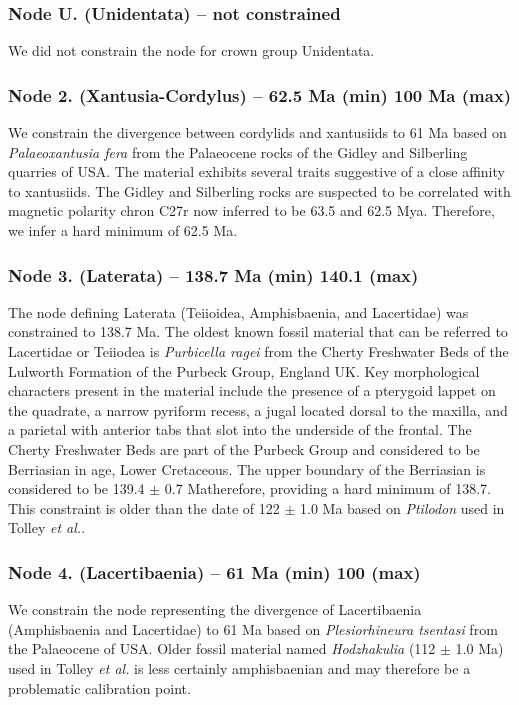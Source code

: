 \documentclass[a4paper, 12pt]{article}
\begin{document}
\subsubsection*{Node U. (Unidentata) – not constrained}
We did not constrain the node for crown group Unidentata.
 
\subsubsection*{Node 2. (Xantusia-Cordylus) – 62.5 Ma (min) 100 Ma (max)}
We constrain the divergence between cordylids and xantusiids to 61 Ma based on \textit{Palaeoxantusia fera} from the Palaeocene rocks of the Gidley and Silberling quarries of USA\cite{smith2009eocene}. The material exhibits several traits suggestive of a close affinity to xantusiids\cite{smith2009eocene,smith2011long}. The Gidley and Silberling rocks are suspected to be correlated with magnetic polarity chron C27r\cite{butler1987magnetic} now inferred to be 63.5 and 62.5 Mya\cite{gradstein2012geologic}. Therefore, we infer a hard minimum of 62.5 Ma.

\subsubsection*{Node 3. (Laterata) – 138.7 Ma (min) 140.1 (max)}
The node defining Laterata (Teiioidea, Amphisbaenia, and Lacertidae) was constrained to 138.7 Ma. The oldest known fossil material that can be referred to Lacertidae or Teiiodea is \textit{Purbicella ragei} from the Cherty Freshwater Beds of the Lulworth Formation of the Purbeck Group, England UK\cite{evans2012new}. Key morphological characters present in the material include the presence of a pterygoid lappet on the quadrate, a narrow pyriform recess, a jugal located dorsal to the maxilla, and a parietal with anterior tabs that slot into the underside of the frontal\cite{conrad2008phylogeny,evans2003feet}. The Cherty Freshwater Beds are part of the Purbeck Group and considered to be Berriasian in age, Lower Cretaceous\cite{radley2012wealden}. The upper boundary of the Berriasian is considered to be 139.4 $\pm$ 0.7 Ma\cite{gradstein2012geologic}therefore, providing a hard minimum of 138.7. This constraint is older than the date of 122 $\pm$ 1.0 Ma based on \textit{Ptilodon}\cite{nydam2002lizards,winkler1990early} used in Tolley \textit{et al.}\cite{tolley2013large}.
  
\subsubsection*{Node 4. (Lacertibaenia) – 61 Ma (min) 100 (max)}
We constrain the node representing the divergence of Lacertibaenia (Amphisbaenia and Lacertidae) to 61 Ma based on \textit{Plesiorhineura tsentasi} from the Palaeocene of USA\cite{sullivan1985new}. Older fossil material named \textit{Hodzhakulia} (112 $\pm$ 1.0 Ma) used in Tolley \textit{et al.}\cite{tolley2013large} is less certainly amphisbaenian and may therefore be a problematic calibration point\cite{hipsley2009integration}.
 
\end{document}
